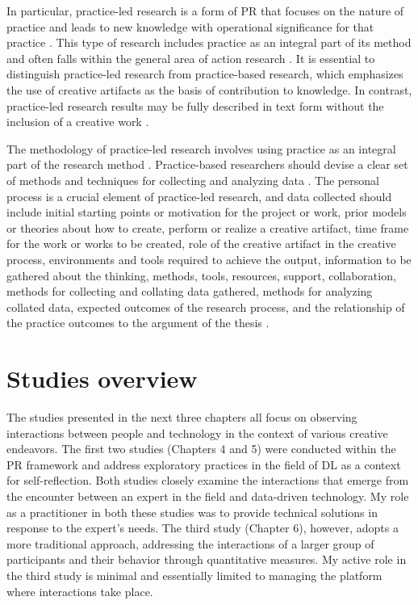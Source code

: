 In particular, practice-led research is a form of PR that focuses on the nature of practice and leads to new knowledge with operational significance for that practice \citep[p. 1]{Candy2006}. This type of research includes practice as an integral part of its method and often falls within the general area of action research \citep[p. 19]{Candy2006}. It is essential to distinguish practice-led research from practice-based research, which emphasizes the use of creative artifacts as the basis of contribution to knowledge. In contrast, practice-led research results may be fully described in text form without the inclusion of a creative work \citep[p. 1]{Candy2006}.

The methodology of practice-led research involves using practice as an integral part of the research method \citep[p. 19]{Candy2006}. Practice-based researchers should devise a clear set of methods and techniques for collecting and analyzing data \citep[p. 19]{Candy2006}. The personal process is a crucial element of practice-led research, and data collected should include initial starting points or motivation for the project or work, prior models or theories about how to create, perform or realize a creative artifact, time frame for the work or works to be created, role of the creative artifact in the creative process, environments and tools required to achieve the output, information to be gathered about the thinking, methods, tools, resources, support, collaboration, methods for collecting and collating data gathered, methods for analyzing collated data, expected outcomes of the research process, and the relationship of the practice outcomes to the argument of the thesis \citep[p. 19]{Candy2006}.

\section{Studies overview}\label{sec:studies-overview}

The studies presented in the next three chapters all focus on observing interactions between people and technology in the context of various creative endeavors. The first two studies (Chapters 4 and 5) were conducted within the PR framework and address exploratory practices in the field of DL as a context for self-reflection. Both studies closely examine the interactions that emerge from the encounter between an expert in the field and data-driven technology. My role as a practitioner in both these studies was to provide technical solutions in response to the expert's needs. The third study (Chapter 6), however, adopts a more traditional approach, addressing the interactions of a larger group of participants and their behavior through quantitative measures. My active role in the third study is minimal and essentially limited to managing the platform where interactions take place.

